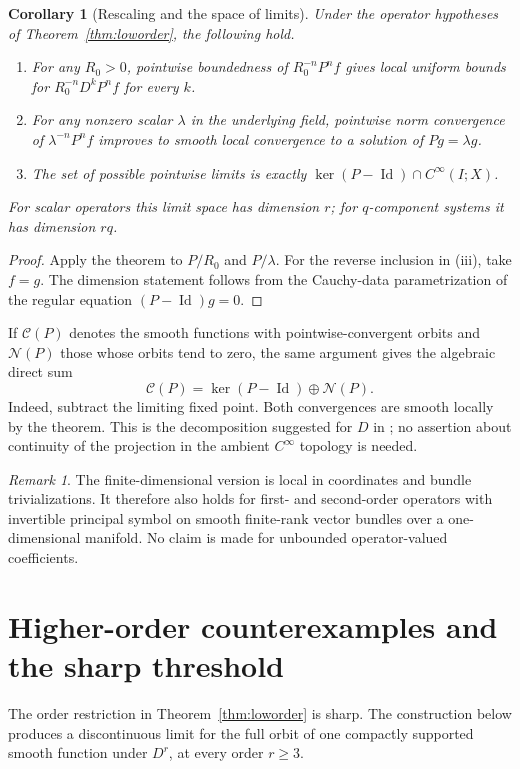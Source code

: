 \documentclass[11pt,reqno]{amsart}
\numberwithin{equation}{section}
\newtheorem{corollary}[theorem]{Corollary}
\theoremstyle{definition}
\theoremstyle{remark}
\newtheorem{remark}[theorem]{Remark}
\newcommand{\id}{\operatorname{Id}}
\begin{document}
\begin{corollary}[Rescaling and the space of limits]\label{cor:limits}
Under the operator hypotheses of Theorem~\ref{thm:loworder}, the following hold.
\begin{enumerate}[label=\textup{(\roman*)},leftmargin=2.3em]
\item For any $R_0>0$, pointwise boundedness of $R_0^{-n}P^nf$ gives local uniform bounds for $R_0^{-n}D^kP^nf$ for every $k$.
\item For any nonzero scalar $\lambda$ in the underlying field, pointwise norm convergence of $\lambda^{-n}P^nf$ improves to smooth local convergence to a solution of $Pg=\lambda g$.
\item The set of possible pointwise limits is exactly $\ker(P-\id)\cap C^\infty(I;X)$.
\end{enumerate}
For scalar operators this limit space has dimension $r$; for $q$-component systems it has dimension $rq$.
\end{corollary}
\begin{proof}
Apply the theorem to $P/R_0$ and $P/\lambda$. For the reverse inclusion in (iii), take $f=g$. The dimension statement follows from the Cauchy-data parametrization of the regular equation $(P-\id)g=0$.
\end{proof}

If $\mathcal C(P)$ denotes the smooth functions with pointwise-convergent orbits and $\mathcal N(P)$ those whose orbits tend to zero, the same argument gives the algebraic direct sum
\begin{equation}\label{eq:decomposition}
 \mathcal C(P)=\ker(P-\id)\oplus\mathcal N(P).
\end{equation}
Indeed, subtract the limiting fixed point. Both convergences are smooth locally by the theorem. This is the decomposition suggested for $D$ in \cite{cusson}; no assertion about continuity of the projection in the ambient $C^\infty$ topology is needed.

\begin{remark}
The finite-dimensional version is local in coordinates and bundle trivializations. It therefore also holds for first- and second-order operators with invertible principal symbol on smooth finite-rank vector bundles over a one-dimensional manifold. No claim is made for unbounded operator-valued coefficients.
\end{remark}

\section{Higher-order counterexamples and the sharp threshold}\label{sec:counter}
The order restriction in Theorem~\ref{thm:loworder} is sharp. The construction below produces a discontinuous limit for the full orbit of one compactly supported smooth function under $D^r$, at every order $r\ge3$.
\end{document}
